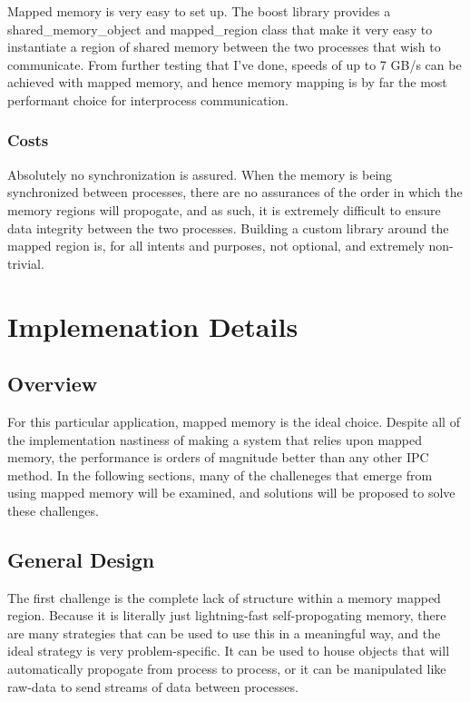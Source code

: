 \documentclass[se]{uw-wkrpt}
\begin{document}
Mapped memory is very easy to set up. The boost library provides a shared\_memory\_object and mapped\_region class
that make it very easy to instantiate a region of shared memory between the two processes that wish to communicate.
From further testing that I've done, speeds of up to 7 GB/s can be achieved with mapped memory, and hence memory mapping
is by far the most performant choice for interprocess communication.

\subsubsection{Costs}

Absolutely no synchronization is assured. When the memory is being synchronized between processes, there are no
assurances of the order in which the memory regions will propogate, and as such, it is extremely difficult to
ensure data integrity between the two processes. Building a custom library around the mapped region is, for
all intents and purposes, not optional, and extremely non-trivial.

\section{Implemenation Details}

\subsection{Overview}

For this particular application, mapped memory is the ideal choice. Despite all of the implementation nastiness
of making a system that relies upon mapped memory, the performance is orders of magnitude better than any other IPC
method. In the following sections, many of the challeneges that emerge from using mapped memory will be examined, and
solutions will be proposed to solve these challenges.

\subsection{General Design}

The first challenge is the complete lack of structure within a memory mapped region. Because it is literally just
lightning-fast self-propogating memory, there are many strategies that can be used to use this in a meaningful way,
and the ideal strategy is very problem-specific. It can be used to house objects that will automatically propogate
from process to process, or it can be manipulated like raw-data to send streams of data between processes. 
\end{document}
